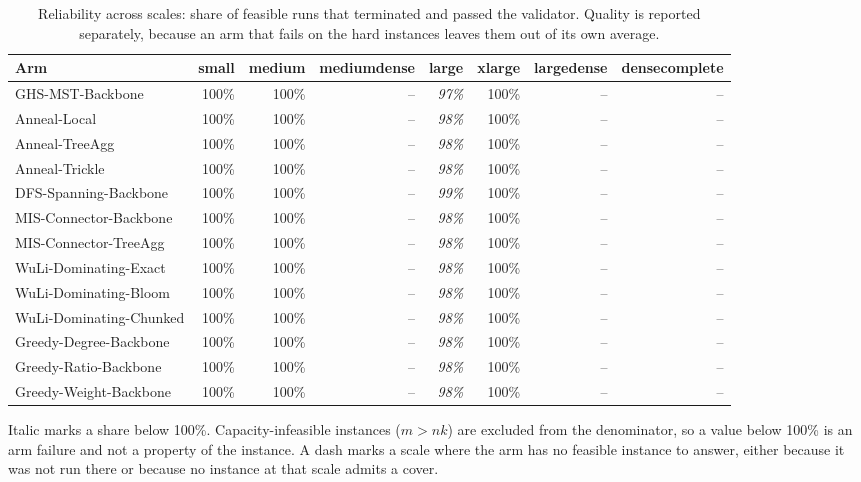 \begin{table}[tb]
\centering
\caption{Reliability across scales: share of feasible runs that terminated and passed the validator. Quality is reported separately, because an arm that fails on the hard instances leaves them out of its own average.}
\label{tab:reliability}
\begin{tabular}{lrrrrrrr}
\toprule
Arm & small & medium & mediumdense & large & xlarge & largedense & densecomplete \\
\midrule
GHS-MST-Backbone & 100\% & 100\% & -- & \textit{97\%} & 100\% & -- & -- \\
Anneal-Local & 100\% & 100\% & -- & \textit{98\%} & 100\% & -- & -- \\
Anneal-TreeAgg & 100\% & 100\% & -- & \textit{98\%} & 100\% & -- & -- \\
Anneal-Trickle & 100\% & 100\% & -- & \textit{98\%} & 100\% & -- & -- \\
DFS-Spanning-Backbone & 100\% & 100\% & -- & \textit{99\%} & 100\% & -- & -- \\
MIS-Connector-Backbone & 100\% & 100\% & -- & \textit{98\%} & 100\% & -- & -- \\
MIS-Connector-TreeAgg & 100\% & 100\% & -- & \textit{98\%} & 100\% & -- & -- \\
WuLi-Dominating-Exact & 100\% & 100\% & -- & \textit{98\%} & 100\% & -- & -- \\
WuLi-Dominating-Bloom & 100\% & 100\% & -- & \textit{98\%} & 100\% & -- & -- \\
WuLi-Dominating-Chunked & 100\% & 100\% & -- & \textit{98\%} & 100\% & -- & -- \\
Greedy-Degree-Backbone & 100\% & 100\% & -- & \textit{98\%} & 100\% & -- & -- \\
Greedy-Ratio-Backbone & 100\% & 100\% & -- & \textit{98\%} & 100\% & -- & -- \\
Greedy-Weight-Backbone & 100\% & 100\% & -- & \textit{98\%} & 100\% & -- & -- \\
\bottomrule
\end{tabular}
\begin{flushleft}\footnotesize
Italic marks a share below 100\%. Capacity-infeasible instances ($m > nk$) are excluded from the denominator, so a value below 100\% is an arm failure and not a property of the instance. A dash marks a scale where the arm has no feasible instance to answer, either because it was not run there or because no instance at that scale admits a cover.
\end{flushleft}
\end{table}
